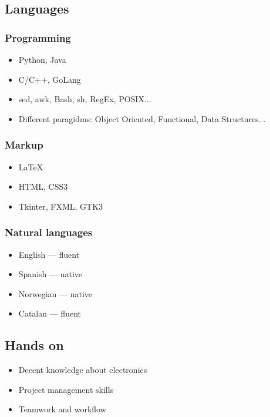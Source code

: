 \documentclass{curriculum}
\begin{document}
	\subsection{Languages}
	\begin{half}
		\subsubsection{Programming}
			\begin{itemize}
				\item Python, Java
				\item C/C++, GoLang
				\item sed, awk, Bash, sh, RegEx, POSIX...
			\item Different paragidms: Object Oriented, Functional, Data Structures...
			\end{itemize}
		\subsubsection{Markup}
			\begin{itemize}
				\item \LaTeX
				\item HTML, CSS3
				\item Tkinter, FXML, GTK3
			\end{itemize}
	\end{half}
	\begin{half}
		\subsubsection{Natural languages}
			\begin{itemize}
				\item English --- fluent
				\item Spanish --- native
				\item Norwegian --- native
				\item Catalan --- fluent
			\end{itemize}
	\subsection{Hands on}
	\begin{itemize} 
		\item Decent knowledge about electronics
		\item Project management skills
		\item Teamwork and workflow
	\end{itemize}	

	\end{half}
\end{document}
